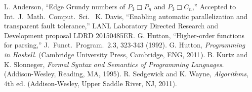 \documentclass[11pt]{article}
\begin{document}
\begin{thebibliography}{99}
 L. Anderson, ``Edge Grundy numbers of $P_3 \Box P_n$ and $P_3 \Box C_n$,'' Accepted to Int.\ J.\ Math.\ Comput.\ Sci.\
 K. Davis, ``Enabling automatic parallelization and transparent fault tolerance,'' LANL Laboratory Directed Research and Development proposal LDRD 20150485ER.
\bibitem{X} G. Hutton, ``Higher-order functions for parsing,'' J.\ Funct.\ Program.\ 2.3, 323-343 (1992).
\bibitem{W} G. Hutton, \textit{Programming in Haskell}. (Cambridge University Press, Cambridge, ENG, 2011). 
\bibitem{V} B. Kurtz and K. Slonneger, \textit{Formal Syntax and Semantics of Programming Languages}. (Addison-Wesley, Reading, MA, 1995).
\bibitem{U} R. Sedgewick and K. Wayne, \textit{Algorithms}, 4th ed. (Addison-Wesley, Upper Saddle River, NJ, 2011).


\end{thebibliography}
\end{document}
